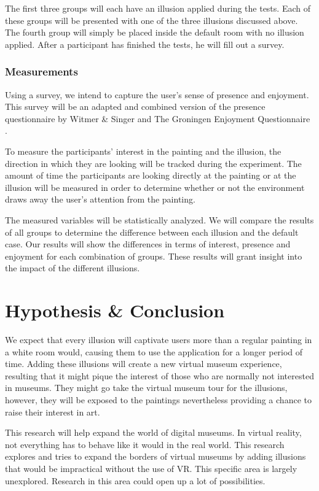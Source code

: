 \documentclass[a4paper]{article}
\begin{document}
The first three groups will each have an illusion applied during the tests. Each of these groups will be presented with one of the three illusions discussed above. The fourth group will simply be placed inside the default room with no illusion applied. After a participant has finished the tests, he will fill out a survey. 

\subsubsection{Measurements}\label{sec:measurements}

Using a survey, we intend to capture the user's sense of presence and enjoyment. This survey will be an adapted and combined version of the presence questionnaire by Witmer \& Singer \cite{witmer} and The Groningen Enjoyment Questionnaire \cite{stevens}.

To measure the participants' interest in the painting and the illusion, the direction in which they are looking will be tracked during the experiment. The amount of time the participants are looking directly at the painting or at the illusion will be measured in order to determine whether or not the environment draws away the user's attention from the painting. 

The measured variables will be statistically analyzed. We will compare the results of all groups to determine the difference between each illusion and the default case. Our results will show the differences in terms of interest, presence and enjoyment for each combination of groups. These results will grant insight into the impact of the different illusions.


\section {Hypothesis \& Conclusion}
We expect that every illusion will captivate users more than a regular painting in a white room would, causing them to use the application for a longer period of time. Adding these illusions will create a new virtual museum experience, resulting that it might pique the interest of those who are normally not interested in museums. They might go take the virtual museum tour for the illusions, however, they will be exposed to the paintings nevertheless providing a chance to raise their interest in art. 

This research will help expand the world of digital museums. In virtual reality, not everything has to behave like it would in the real world. This research explores and tries to expand the borders of virtual museums by adding illusions that would be impractical without the use of VR. This specific area is largely unexplored. Research in this area could open up a lot of possibilities.
\end{document}
